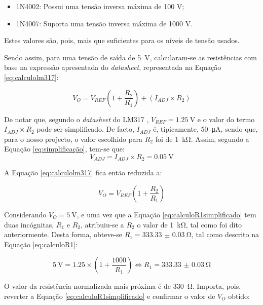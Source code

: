 \begin{itemize}
	\item 1N4002: Possui uma tensão inversa máxima de 100 V;
	\item 1N4007: Suporta uma tensão inversa máxima de 1000 V.
\end{itemize}

Estes valores são, pois, mais que suficientes para os níveis de tensão usados.

Sendo assim, para uma tensão de saída de \SI{5}{\volt}, calcularam-se as resistências com base na expressão apresentada do \textit{datasheet}, representada na Equação \ref{eq:calculolm317}: 

\begin{equation} \label{eq:calculolm317}
	V_{O} = V_{REF} (1 + \frac{R_{2}}{R_{1}}) + (I_{ADJ} \times R_{2})
\end{equation}

De notar que, segundo o \textit{datasheet} do LM317 \cite{LM317}, $V_{REF} = \SI{1.25}{\volt}$ e o valor do termo $I_{ADJ} \times R_{2}$ pode ser simplificado. De facto, $I_{ADJ}$ é, tipicamente, \SI{50}{\micro\ampere}, sendo que, para o nosso projecto, o valor escolhido para $R_{2}$ foi de \SI{1}{\kilo\ohm}. Assim, segundo a Equação \ref{eq:simplificação}, tem-se que:
\begin{equation} \label{eq:simplificação}
	V_{ADJ} = I_{ADJ} \times R_{2} = \SI{0.05}{\volt}
\end{equation}

A Equação \ref{eq:calculolm317} fica então reduzida a:

\begin{equation} \label{eq:calculoR1simplificado}
	V_{O} = V_{REF} (1 + \frac{R_{2}}{R_{1}})
\end{equation}

Considerando $V_{O} = \SI{5}{\volt}$, e uma vez que a Equação \ref{eq:calculoR1simplificado} tem duas incógnitas, $R_{1}$ e $R_{2}$, atribuiu-se a $R_{2}$ o valor de \SI{1}{\kilo\ohm}, tal como foi dito anteriormente. Desta forma, obteve-se $R_{1} = \SI{333.33(3)}{\ohm}$, tal como descrito na Equação \ref{eq:calculoR1}: 

\begin{equation} \label{eq:calculoR1}
	\SI{5}{\volt} = 1.25 \times (1 + \frac{1000}{R_{1}}) \Leftrightarrow R_{1} = \SI{333.33(3)}{\ohm}
\end{equation}

O valor da resistência normalizada mais próxima é de \SI{330}{\ohm}. Importa, pois, reverter a Equação \ref{eq:calculoR1simplificado} e confirmar o valor de  $V_{O}$ obtido:

